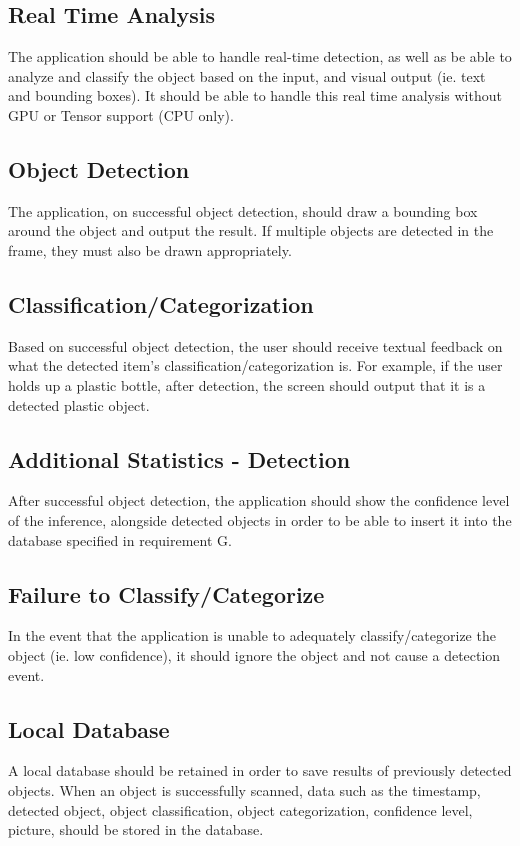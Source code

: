 \documentclass[conference]{IEEEtran}
\begin{document}
\subsection{Real Time Analysis}

The application should be able to handle real-time detection, as well as be able to analyze and classify the object based on the input, and  visual output (ie. text and bounding boxes). It should be able to handle this real time analysis without GPU or Tensor support (CPU only).
\newline
\subsection{Object Detection}

The application, on successful object detection, should draw a bounding box around the object and output the result. If multiple objects are detected in the frame, they must also be drawn appropriately.
\newline
\subsection{Classification/Categorization}

Based on successful object detection, the user should receive textual feedback on what the detected item's classification/categorization is. For example, if the user holds up a plastic bottle, after detection, the screen should output that it is a detected plastic object.
\newline
\subsection{Additional Statistics - Detection}

After successful object detection, the application should show the confidence level of the inference, alongside detected objects in order to be able to insert it into the database specified in requirement G.
\newline
\subsection{Failure to Classify/Categorize}

In the event that the application is unable to adequately classify/categorize the object (ie. low confidence), it should ignore the object and not cause a detection event.
\newline
\subsection{Local Database}
A local database should be retained in order to save results of previously detected objects. When an object is successfully scanned, data such as the timestamp, detected object, object classification, object categorization, confidence level, picture, should be stored in the database.
\end{document}
